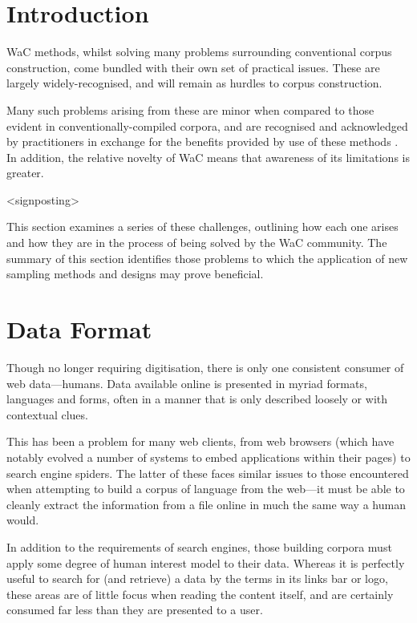 
\section{Introduction}
WaC methods, whilst solving many problems surrounding conventional corpus construction, come bundled with their own set of practical issues.  These are largely widely-recognised, and will remain as hurdles to corpus construction.  

Many such problems arising from these are minor when compared to those evident in conventionally-compiled corpora, and are recognised and acknowledged by practitioners in exchange for the benefits provided by use of these methods %
.  In addition, the relative novelty of WaC means that awareness of its limitations is greater.


<signposting>

This section examines a series of these challenges, outlining how each one arises and how they are in the process of being solved by the WaC community.  The summary of this section identifies those problems to which the application of new sampling methods and designs may prove beneficial.



\section{Data Format}
Though no longer requiring digitisation, there is only one consistent consumer of web data---humans.  Data available online is presented in myriad formats, languages and forms, often in a manner that is only described loosely or with contextual clues.

This has been a problem for many web clients, from web browsers (which have notably evolved a number of systems to embed applications within their pages) to search engine spiders.  The latter of these faces similar issues to those encountered when attempting to build a corpus of language from the web---it must be able to cleanly extract the information from a file online in much the same way a human would.

In addition to the requirements of search engines, those building corpora must apply some degree of human interest model to their data.  Whereas it is perfectly useful to search for (and retrieve) a data by the terms in its links bar or logo, these areas are of little focus when reading the content itself, and are certainly consumed far less than they are presented to a user.

